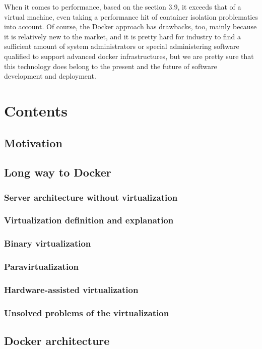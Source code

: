 When it comes to performance, based on the section 3.9, it exceeds
that of a virtual machine,
even taking a performance
hit of container isolation problematics into account.
Of course, the Docker approach has drawbacks, too, mainly
because it is relatively new to the market,
and it is pretty hard for industry to find
a sufficient amount of system administrators or special
administering software qualified to support advanced docker infrastructures,
but we are pretty sure that this technology does belong to the
present and the future of software development and deployment.

\appendix
\section{Contents}
\subsection{Motivation}
\subsection{Long way to Docker}
\subsubsection{Server architecture without virtualization}
\subsubsection{Virtualization definition and explanation}
\subsubsection{Binary virtualization}
\subsubsection{Paravirtualization}
\subsubsection{Hardware-assisted virtualization}
\subsubsection{Unsolved problems of the virtualization}
\subsection{Docker architecture}
